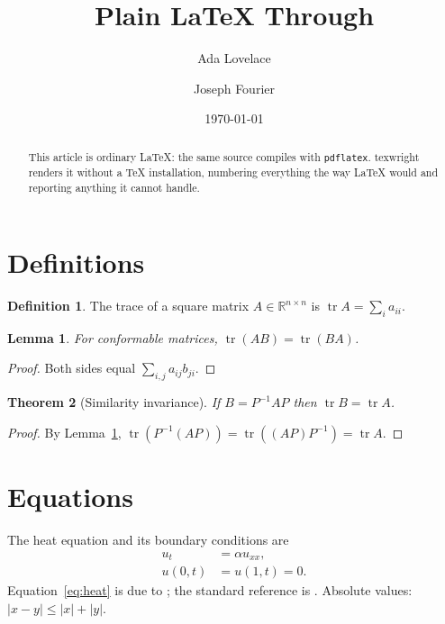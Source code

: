 \documentclass[11pt]{article}
\title{Plain \LaTeX{} Through \project}
\author{Ada Lovelace \and Joseph Fourier}
\date{\today}
\newtheorem{theorem}{Theorem}[section]
\newtheorem{lemma}[theorem]{Lemma}
\theoremstyle{definition}
\newtheorem{definition}{Definition}
\newcommand{\R}{\mathbb{R}}
\newcommand{\abs}[1]{\left\lvert #1 \right\rvert}
\DeclareMathOperator{\tr}{tr}
\newcommand{\project}{texwright}
\begin{document}
\maketitle

\begin{abstract}
This article is ordinary \LaTeX{}: the same source compiles with \texttt{pdflatex}.
\project{} renders it without a TeX installation, numbering everything the way
\LaTeX{} would and reporting anything it cannot handle.
\end{abstract}

\tableofcontents

\section{Definitions}\label{sec:defs}

\begin{definition}\label{def:trace}
The trace of a square matrix $A \in \R^{n \times n}$ is $\tr A = \sum_{i} a_{ii}$.
\end{definition}

\begin{lemma}\label{lem:cyclic}
For conformable matrices, $\tr(AB) = \tr(BA)$.
\end{lemma}

\begin{proof}
Both sides equal $\sum_{i,j} a_{ij} b_{ji}$.
\end{proof}

\begin{theorem}[Similarity invariance]\label{thm:sim}
If $B = P^{-1} A P$ then $\tr B = \tr A$.
\end{theorem}

\begin{proof}
By Lemma~\ref{lem:cyclic}, $\tr(P^{-1} (A P)) = \tr((A P) P^{-1}) = \tr A$.
\end{proof}

\section{Equations}\label{sec:eqs}

The heat equation and its boundary conditions are
\begin{align}
  u_t &= \alpha u_{xx}, \label{eq:heat}\\
  u(0,t) &= u(1,t) = 0. \label{eq:bc}
\end{align}
Equation~\eqref{eq:heat} is due to \citet{fourier1822}; the standard reference
is \citep[ch.~2]{evans2010}. Absolute values: $\abs{x - y} \le \abs{x} + \abs{y}$.
\end{document}
